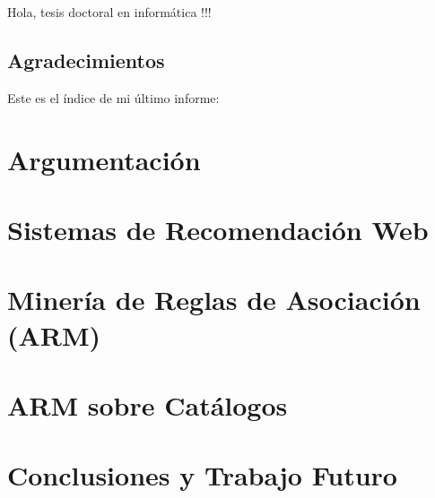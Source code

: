\documentclass[utf8]{book}
\begin{document}
Hola, tesis doctoral en informática !!!
\newpage

\section*{Agradecimientos}

\newpage


Este es el índice de mi último informe: 

\tableofcontents

\chapter*{Argumentación}
\label{chap:argumentacion}





\chapter{Sistemas de Recomendación Web}
\label{chap:SRW}





\chapter{Minería de Reglas de Asociación (ARM)}
\label{chap:arm}





\chapter{ARM sobre Catálogos}
\label{chap:catalogos}





\chapter{Conclusiones y Trabajo Futuro}
\label{chap:conclusiones-y-trabajo-futuro}


\end{document}
